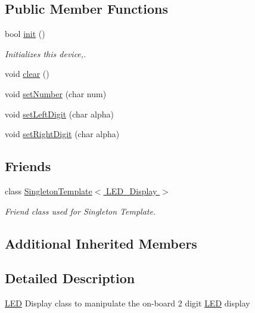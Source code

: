 \subsection*{Public Member Functions}
\begin{DoxyCompactItemize}
\item 
bool \hyperlink{classLED__Display_a075e60d1b0829a70f03f0a342bffcb21}{init} ()
\begin{DoxyCompactList}\small\item\em Initializes this device,. \end{DoxyCompactList}\item 
void \hyperlink{classLED__Display_aa1ec976d360ad46ecb7e437cfad97ea5}{clear} ()
\item 
void \hyperlink{classLED__Display_a8802392543700dc03694b56b2c946c5a}{set\+Number} (char num)
\end{DoxyCompactItemize}
{\bf }\par
\begin{DoxyCompactItemize}
\item 
void \hyperlink{classLED__Display_a4d7e45c39a2bef9ddfe4167b240cfb18}{set\+Left\+Digit} (char alpha)
\item 
void \hyperlink{classLED__Display_a836014e9527724cb8fcadbc37582fba3}{set\+Right\+Digit} (char alpha)
\end{DoxyCompactItemize}

\subsection*{Friends}
\begin{DoxyCompactItemize}
\item 
class \hyperlink{classLED__Display_a7a993cfbec5ab2677708ad0426cf843b}{Singleton\+Template$<$ L\+E\+D\+\_\+\+Display $>$}
\begin{DoxyCompactList}\small\item\em Friend class used for Singleton Template. \end{DoxyCompactList}\end{DoxyCompactItemize}
\subsection*{Additional Inherited Members}


\subsection{Detailed Description}
\hyperlink{classLED}{L\+ED} Display class to manipulate the on-\/board 2 digit \hyperlink{classLED}{L\+ED} display 

